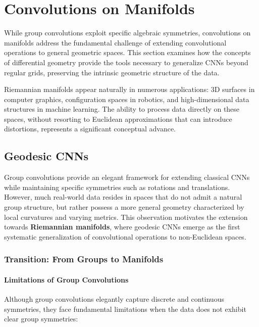 \section{Convolutions on Manifolds}\label{sec:manifold_cnns}

While group convolutions exploit specific algebraic symmetries, convolutions on manifolds address the fundamental challenge of extending convolutional operations to general geometric spaces. This section examines how the concepts of differential geometry provide the tools necessary to generalize \glspl{CNN} beyond regular grids, preserving the intrinsic geometric structure of the data.

Riemannian manifolds appear naturally in numerous applications: 3D surfaces in computer graphics, configuration spaces in robotics, and high-dimensional data structures in machine learning. The ability to process data directly on these spaces, without resorting to Euclidean approximations that can introduce distortions, represents a significant conceptual advance.

\subsection{Geodesic CNNs}\label{subsec:geodesic_cnns}

Group convolutions provide an elegant framework for extending classical \glspl{CNN} while maintaining specific symmetries such as rotations and translations. However, much real-world data resides in spaces that do not admit a natural group structure, but rather possess a more general geometry characterized by local curvatures and varying metrics. This observation motivates the extension towards \textbf{Riemannian manifolds}, where geodesic CNNs emerge as the first systematic generalization of convolutional operations to non-Euclidean spaces.

\subsubsection{Transition: From Groups to Manifolds}

\paragraph{Limitations of Group Convolutions}

Although group convolutions elegantly capture discrete and continuous symmetries, they face fundamental limitations when the data does not exhibit clear group symmetries:

